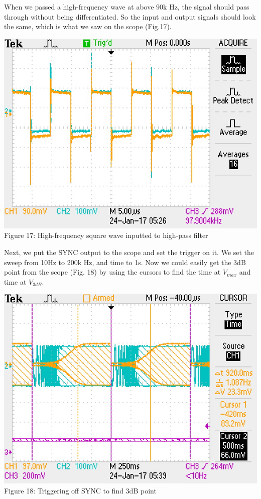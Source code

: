 \documentclass[]{article}
\begin{document}
When we passed a high-frequency wave at above 90k Hz, the signal should pass through without being differentiated. So the input and output signals should look the same, which is what we saw on the scope (Fig.17).
	\begin{center}
		\includegraphics[scale=0.7]{f_hipass2}\\
		Figure 17: High-frequency square wave inputted to high-pass filter
	\end{center}
	Next, we put the SYNC output to the scope and set the trigger on it. We set the sweep from 10Hz to 200k Hz, and time to 1s. Now we could easily get the 3dB point from the scope (Fig. 18) by using the cursors to find the time at $V_{max}$ and time at $V_{3dB}$.
		\begin{center}
			\includegraphics[scale=0.8]{f_3db}\\
			Figure 18: Triggering off SYNC to find 3dB point
		\end{center}
		 
\end{document}
